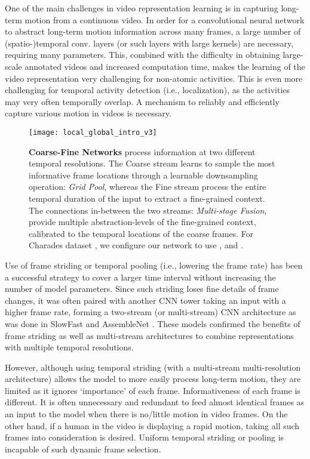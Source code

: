 \documentclass[final]{cvpr}
\begin{document}
One of the main challenges in video representation learning is in capturing long-term motion from a continuous video. 
In order for a convolutional neural network to abstract long-term motion information across many frames, a large number of (spatio-)temporal conv. layers (or such layers with large kernels) are necessary, requiring many parameters. This, combined with the difficulty in obtaining large-scale annotated videos and increased computation time, makes the learning of the video representation very challenging for non-atomic activities. This is even more challenging for temporal activity detection (i.e., localization), as the activities may very often temporally overlap.
A mechanism to reliably and efficiently capture various motion in videos is necessary.

\begin{figure}[t]
	\centering
	\hspace{-10mm}
	\vspace{-1mm}
	\texttt{[image: local\_global\_intro\_v3]}
\caption{\textbf{Coarse-Fine Networks} process information at two different temporal resolutions. The Coarse stream learns to sample the most informative frame locations through a learnable downsampling operation: \textit{Grid Pool}, whereas the Fine stream process the entire temporal duration of the input to extract a fine-grained context. The connections in-between the two streams: \textit{Multi-stage Fusion}, provide multiple abstraction-levels of the fine-grained context, calibrated to the temporal locations of the coarse frames. For Charades dataset \cite{sigurdsson2016hollywood}, we configure our network to use ,  and .}
	\vspace{-5mm}
	\label{fig:intro}
\end{figure}

Use of frame striding or temporal pooling (i.e., lowering the frame rate) has been a successful strategy to cover a larger time interval without increasing the number of model parameters. Since such striding loses fine details of frame changes, it was often paired with another CNN tower taking an input with a higher frame rate, forming a two-stream (or multi-stream) CNN architecture as was done in SlowFast \cite{feichtenhofer2019slowfast} and AssembleNet \cite{ryoo2019assemblenet}. 
These models confirmed the benefits of frame striding as well as multi-stream architectures to combine representations with multiple temporal resolutions.

However, although using temporal striding (with a multi-stream multi-resolution architecture) allows the model to more easily process long-term motion, they are limited as it ignores `importance' of each frame.
Informativeness of each frame is different. It is often unnecessary and redundant to feed almost identical frames as an input to the model when there is no/little motion in video frames. On the other hand, if a human in the video is displaying a rapid motion, taking all such frames into consideration is desired. Uniform temporal striding or pooling is incapable of such dynamic frame selection. 
\end{document}
